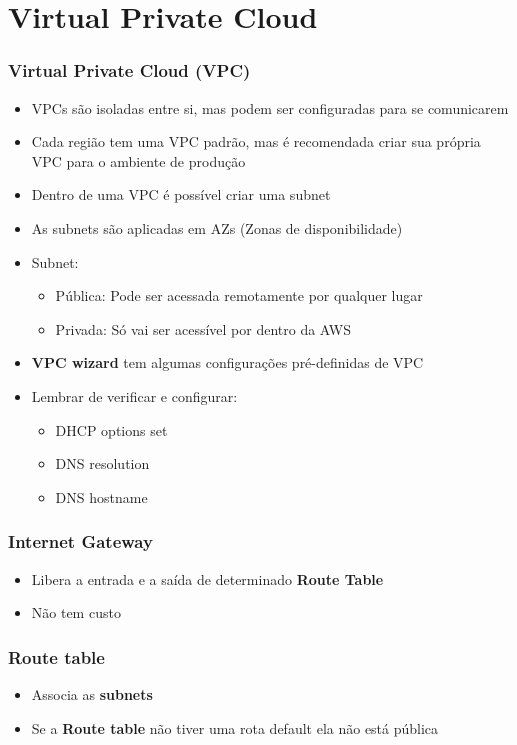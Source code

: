 \section{Virtual Private Cloud}

\begin{frame}
	\frametitle{Virtual Private Cloud (VPC)}
	\begin{itemize}
		\item VPCs são isoladas entre si, mas podem ser configuradas para se comunicarem
		\item Cada região tem uma VPC padrão, mas é recomendada criar sua própria VPC para o ambiente de produção
		\item Dentro de uma VPC é possível criar uma subnet
		\item As subnets são aplicadas em AZs (Zonas de disponibilidade)
		\item Subnet:
			\begin{itemize}
				\item Pública: Pode ser acessada remotamente por qualquer lugar
				\item Privada: Só vai ser acessível por dentro da AWS
			\end{itemize}
		\item \textbf{VPC wizard} tem algumas configurações pré-definidas de VPC
		\item Lembrar de verificar e configurar:
		\begin{itemize}
			\item DHCP options set
			\item DNS resolution
			\item DNS hostname
		\end{itemize}
	\end{itemize}
\end{frame}

\begin{frame}
	\frametitle{Internet Gateway}
	\begin{itemize}
		\item Libera a entrada e a saída de determinado \textbf{Route Table}
		\item Não tem custo
	\end{itemize}
\end{frame}

\begin{frame}
	\frametitle{Route table}
	\begin{itemize}
		\item Associa as \textbf{subnets}
		\item Se a \textbf{Route table} não tiver uma rota default ela não está pública
	\end{itemize}
\end{frame}


